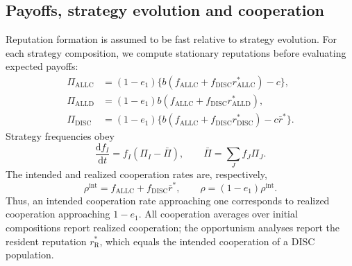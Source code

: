 \documentclass[fleqn,10pt]{article}
\begin{document}
\subsection*{Payoffs, strategy evolution and cooperation}

Reputation formation is assumed to be fast relative to strategy evolution. For each strategy composition, we compute stationary reputations before evaluating expected payoffs:
\begin{equation}
\begin{aligned}
\Pi_{\mathrm{ALLC}}&=(1-e_1)\{b(f_{\mathrm{ALLC}}+f_{\mathrm{DISC}}r_{\mathrm{ALLC}}^*)-c\},\\
\Pi_{\mathrm{ALLD}}&=(1-e_1)b(f_{\mathrm{ALLC}}+f_{\mathrm{DISC}}r_{\mathrm{ALLD}}^*),\\
\Pi_{\mathrm{DISC}}&=(1-e_1)\{b(f_{\mathrm{ALLC}}+f_{\mathrm{DISC}}r_{\mathrm{DISC}}^*)-c\bar r^*\}.
\end{aligned}
\label{eq:methods-payoffs}
\end{equation}
Strategy frequencies obey
\begin{equation}
\frac{\mathrm df_I}{\mathrm dt}=f_I(\Pi_I-\bar\Pi),
\qquad \bar\Pi=\sum_J f_J\Pi_J.
\label{eq:methods-replicator}
\end{equation}
The intended and realized cooperation rates are, respectively,
\begin{equation}
\rho^{\mathrm{int}}=f_{\mathrm{ALLC}}+f_{\mathrm{DISC}}\bar r^*,
\qquad \rho=(1-e_1)\rho^{\mathrm{int}}.
\label{eq:methods-cooperation}
\end{equation}
Thus, an intended cooperation rate approaching one corresponds to realized cooperation approaching $1-e_1$. All cooperation averages over initial compositions report realized cooperation; the opportunism analyses report the resident reputation $r_{\mathrm R}^*$, which equals the intended cooperation of a DISC population.
\end{document}
